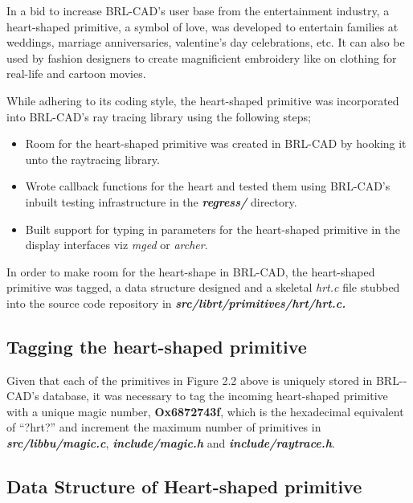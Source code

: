 \hspace{30} In a bid to increase BRL-­CAD's user base from the entertainment industry, 
a heart-­shaped primitive, a symbol of love, was developed to entertain families at weddings,
 marriage   anniversaries,   valentine's   day   celebrations,   etc. It can also be used by
 fashion   designers   to   create   magnificient   embroidery like on  
clothing for real-life and cartoon movies.    

\hspace{30} While   adhering   to   its   coding   style,  the heart-­shaped  
primitive was incorporated into BRL­-CAD's ray tracing library using the following steps;  

\begin{itemize}
\item Room for the heart-shaped primitive was created in BRL­-CAD by hooking it unto the raytracing library.  
\item Wrote callback   functions   for   the   heart   and   tested   them   using   BRL-­CAD's  
inbuilt testing infrastructure in the \textit{\textbf{regress/}} directory.  
\item Built   support   for   typing   in   parameters   for   the   heart­-shaped   primitive   in   the  
display interfaces viz \textit{mged} or \textit{archer}.
\end{itemize}

In   order   to   make   room   for   the   heart­-shape   in   BRL-­CAD, the   heart-shaped  
primitive was tagged, a data   structure designed and  a skeletal   \textit{hrt.c}   file stubbed  into  
the source code repository in \textbf{\textit{src/librt/primitives/hrt/hrt.c.}}

\subsection{Tagging the heart­-shaped primitive}

Given   that   each   of   the   primitives   in   Figure   2.2   above   is   uniquely   stored   in  
BRL-­CAD's   database,   it   was   necessary   to   tag   the   incoming   heart-­shaped  
primitive   with   a   unique   magic   number,   \textbf{Ox6872743f},   which   is   the   hexadecimal  
equivalent   of   “?hrt?”   and   increment   the   maximum   number   of   primitives   in  
\textbf{\textit{src/libbu/magic.c}}, \textbf{\textit{include/magic.h}} and \textbf{\textit{include/raytrace.h}}.  

\subsection{Data Structure of Heart-shaped primitive }


